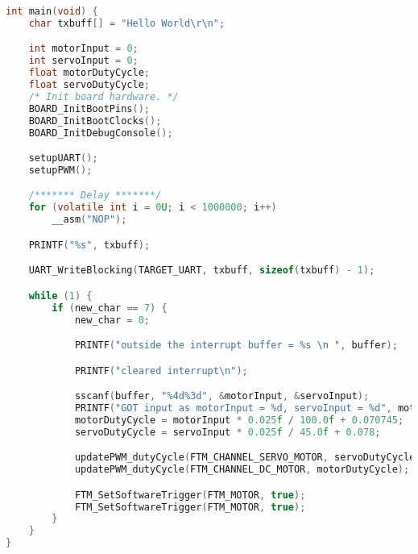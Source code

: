 \begin{lstlisting}[language=c,caption=Problem 3 main, label=list:p3_main]
int main(void) {
    char txbuff[] = "Hello World\r\n";

    int motorInput = 0;
    int servoInput = 0;
    float motorDutyCycle;
    float servoDutyCycle;
    /* Init board hardware. */
    BOARD_InitBootPins();
    BOARD_InitBootClocks();
    BOARD_InitDebugConsole();

    setupUART();
    setupPWM();

    /******* Delay *******/
    for (volatile int i = 0U; i < 1000000; i++)
        __asm("NOP");

    PRINTF("%s", txbuff);

    UART_WriteBlocking(TARGET_UART, txbuff, sizeof(txbuff) - 1);

    while (1) {
        if (new_char == 7) {
            new_char = 0;

            PRINTF("outside the interrupt buffer = %s \n ", buffer);

            PRINTF("cleared interrupt\n");

            sscanf(buffer, "%4d%3d", &motorInput, &servoInput);
            PRINTF("GOT input as motorInput = %d, servoInput = %d", motorInput, servoInput);
            motorDutyCycle = motorInput * 0.025f / 100.0f + 0.070745;
            servoDutyCycle = servoInput * 0.025f / 45.0f + 0.078;

            updatePWM_dutyCycle(FTM_CHANNEL_SERVO_MOTOR, servoDutyCycle);
            updatePWM_dutyCycle(FTM_CHANNEL_DC_MOTOR, motorDutyCycle);

            FTM_SetSoftwareTrigger(FTM_MOTOR, true);
            FTM_SetSoftwareTrigger(FTM_MOTOR, true);
        }
    }
}
\end{lstlisting}